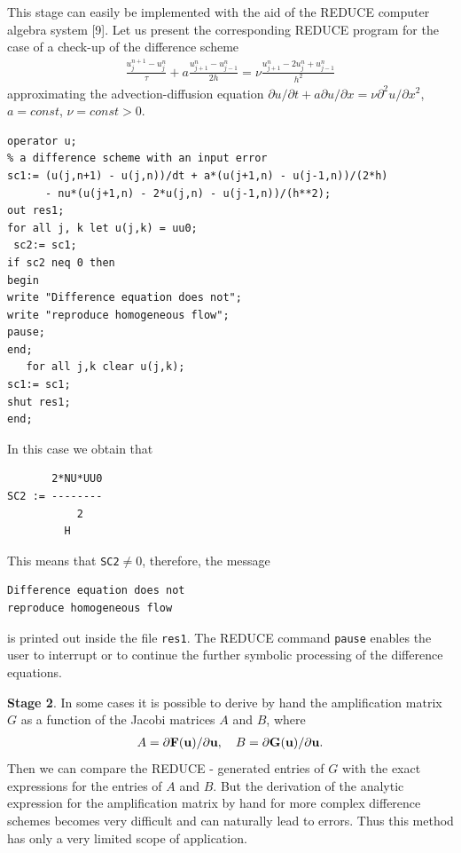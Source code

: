      This stage can easily be implemented with the aid of the REDUCE computer
algebra system [9]. Let us present the corresponding REDUCE program for the
case of a check-up of the difference scheme
\begin{eqnarray*}
\frac{u_j^{n+1}-u_j^n}{\tau} + a\frac{u_{j+1}^n-u_{j-1}^n}{2h}=
\nu\frac{u_{j+1}^n-2u_j^n+u_{j-1}^n}{h^2}
\end{eqnarray*}
approximating the advection-diffusion equation $\partial u/\partial t +
a\partial u/\partial x=\nu\partial^2u/\partial x^2$, $a=const$, $\nu=const>0.$
\begin{verbatim}
operator u;
% a difference scheme with an input error
sc1:= (u(j,n+1) - u(j,n))/dt + a*(u(j+1,n) - u(j-1,n))/(2*h)
      - nu*(u(j+1,n) - 2*u(j,n) - u(j-1,n))/(h**2);
out res1;
for all j, k let u(j,k) = uu0;
 sc2:= sc1;
if sc2 neq 0 then
begin
write "Difference equation does not";
write "reproduce homogeneous flow";
pause;
end;
   for all j,k clear u(j,k);
sc1:= sc1;
shut res1;
end;
\end{verbatim}
In this case we obtain that
\begin{verbatim}
       2*NU*UU0
SC2 := --------
           2
         H
\end{verbatim}
This means that {\tt SC2}$\neq 0$, therefore, the message
\begin{verbatim}
Difference equation does not
reproduce homogeneous flow
\end{verbatim}
is printed out inside the file {\tt res1}. The REDUCE command {\tt pause}
enables the user to interrupt or to continue the further symbolic processing
of the difference equations.

{\bf Stage 2}. In some cases it is possible to derive by hand the amplification matrix $G$
as a function of the Jacobi matrices $A$ and $B$, where
\begin{eqnarray}
A = \partial {\bf F}({\bf u})/\partial {\bf u},\quad
B = \partial {\bf G}({\bf u})/\partial {\bf u}.
\end{eqnarray}
Then we can compare the REDUCE - generated entries of $G$ with the exact
expressions for the entries of $A$ and $B$. But the derivation of the analytic
expression for the amplification matrix
by hand for more complex difference schemes becomes very difficult and can
naturally lead to errors. Thus this method has only a very limited
scope of application.

